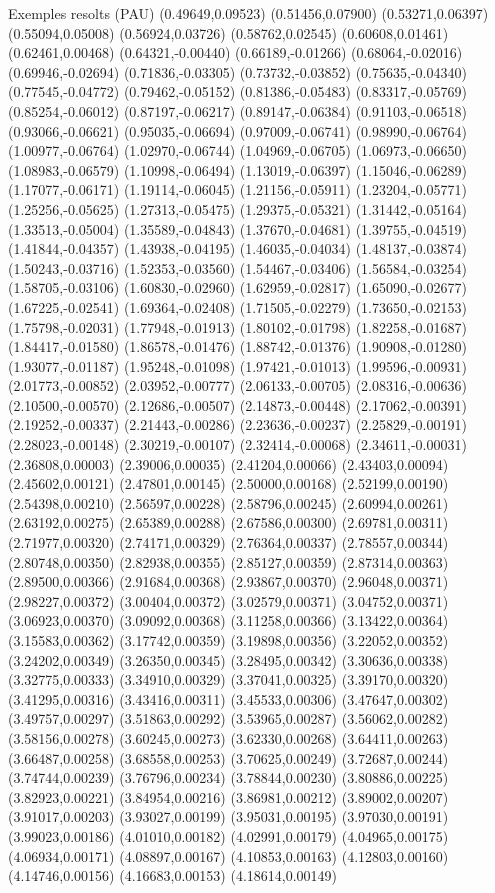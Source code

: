 \documentclass[11pt,a4paper]{article}
\begin{document}
\begin{fmex}{Exemples resolts (PAU)}
(0.49649,0.09523) (0.51456,0.07900) (0.53271,0.06397) (0.55094,0.05008) (0.56924,0.03726) (0.58762,0.02545) (0.60608,0.01461) (0.62461,0.00468) (0.64321,-0.00440) (0.66189,-0.01266) (0.68064,-0.02016) (0.69946,-0.02694) (0.71836,-0.03305) (0.73732,-0.03852) (0.75635,-0.04340) (0.77545,-0.04772) (0.79462,-0.05152) (0.81386,-0.05483) (0.83317,-0.05769) (0.85254,-0.06012) (0.87197,-0.06217) (0.89147,-0.06384) (0.91103,-0.06518) (0.93066,-0.06621) (0.95035,-0.06694) (0.97009,-0.06741) (0.98990,-0.06764) (1.00977,-0.06764) (1.02970,-0.06744) (1.04969,-0.06705) (1.06973,-0.06650) (1.08983,-0.06579) (1.10998,-0.06494) (1.13019,-0.06397) (1.15046,-0.06289) (1.17077,-0.06171) (1.19114,-0.06045) (1.21156,-0.05911) (1.23204,-0.05771) (1.25256,-0.05625) (1.27313,-0.05475) (1.29375,-0.05321) (1.31442,-0.05164) (1.33513,-0.05004) (1.35589,-0.04843) (1.37670,-0.04681) (1.39755,-0.04519) (1.41844,-0.04357) (1.43938,-0.04195) (1.46035,-0.04034) (1.48137,-0.03874) (1.50243,-0.03716) (1.52353,-0.03560) (1.54467,-0.03406) (1.56584,-0.03254) (1.58705,-0.03106) (1.60830,-0.02960) (1.62959,-0.02817) (1.65090,-0.02677) (1.67225,-0.02541) (1.69364,-0.02408) (1.71505,-0.02279) (1.73650,-0.02153) (1.75798,-0.02031) (1.77948,-0.01913) (1.80102,-0.01798) (1.82258,-0.01687) (1.84417,-0.01580) (1.86578,-0.01476) (1.88742,-0.01376) (1.90908,-0.01280) (1.93077,-0.01187) (1.95248,-0.01098) (1.97421,-0.01013) (1.99596,-0.00931) (2.01773,-0.00852) (2.03952,-0.00777) (2.06133,-0.00705) (2.08316,-0.00636) (2.10500,-0.00570) (2.12686,-0.00507) (2.14873,-0.00448) (2.17062,-0.00391) (2.19252,-0.00337) (2.21443,-0.00286) (2.23636,-0.00237) (2.25829,-0.00191) (2.28023,-0.00148) (2.30219,-0.00107) (2.32414,-0.00068) (2.34611,-0.00031) (2.36808,0.00003) (2.39006,0.00035) (2.41204,0.00066) (2.43403,0.00094) (2.45602,0.00121) (2.47801,0.00145) (2.50000,0.00168) (2.52199,0.00190) (2.54398,0.00210) (2.56597,0.00228) (2.58796,0.00245) (2.60994,0.00261) (2.63192,0.00275) (2.65389,0.00288) (2.67586,0.00300) (2.69781,0.00311) (2.71977,0.00320) (2.74171,0.00329) (2.76364,0.00337) (2.78557,0.00344) (2.80748,0.00350) (2.82938,0.00355) (2.85127,0.00359) (2.87314,0.00363) (2.89500,0.00366) (2.91684,0.00368) (2.93867,0.00370) (2.96048,0.00371) (2.98227,0.00372) (3.00404,0.00372) (3.02579,0.00371) (3.04752,0.00371) (3.06923,0.00370) (3.09092,0.00368) (3.11258,0.00366) (3.13422,0.00364) (3.15583,0.00362) (3.17742,0.00359) (3.19898,0.00356) (3.22052,0.00352) (3.24202,0.00349) (3.26350,0.00345) (3.28495,0.00342) (3.30636,0.00338) (3.32775,0.00333) (3.34910,0.00329) (3.37041,0.00325) (3.39170,0.00320) (3.41295,0.00316) (3.43416,0.00311) (3.45533,0.00306) (3.47647,0.00302) (3.49757,0.00297) (3.51863,0.00292) (3.53965,0.00287) (3.56062,0.00282) (3.58156,0.00278) (3.60245,0.00273) (3.62330,0.00268) (3.64411,0.00263) (3.66487,0.00258) (3.68558,0.00253) (3.70625,0.00249) (3.72687,0.00244) (3.74744,0.00239) (3.76796,0.00234) (3.78844,0.00230) (3.80886,0.00225) (3.82923,0.00221) (3.84954,0.00216) (3.86981,0.00212) (3.89002,0.00207) (3.91017,0.00203) (3.93027,0.00199) (3.95031,0.00195) (3.97030,0.00191) (3.99023,0.00186) (4.01010,0.00182) (4.02991,0.00179) (4.04965,0.00175) (4.06934,0.00171) (4.08897,0.00167) (4.10853,0.00163) (4.12803,0.00160) (4.14746,0.00156) (4.16683,0.00153) (4.18614,0.00149) 
\end{fmex}
\end{document}
